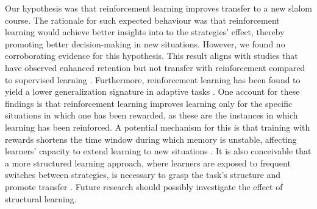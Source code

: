 Our hypothesis was that reinforcement learning improves transfer to a new slalom course. The rationale for such expected behaviour was that reinforcement learning would achieve better insights into to the strategies' effect, thereby promoting better decision-making in new situations. However, we found no corroborating evidence for this hypothesis. This result aligns with studies that have observed enhanced retention but not transfer with reinforcement compared to supervised learning \cite{hasson_reinforcement_2015}. Furthermore, reinforcement learning has been found to yield a lower generalization signature in adaptive tasks \cite{lior_shmuelof_overcoming_2012}. One account for these findings is that reinforcement learning improves learning only for the specific situations in which one has been rewarded, as these are the instances in which learning has been reinforced. A potential mechanism for this is that training with rewards shortens the time window during which memory is unstable, affecting learners' capacity to extend learning to new situations \cite{robertson_memory_2018}. It is also conceivable that a more structured learning approach, where learners are exposed to frequent switches between strategies, is necessary to grasp the task's structure and promote transfer \cite{braun_structure_2010}. Future research should possibly investigate the effect of structural learning. 



